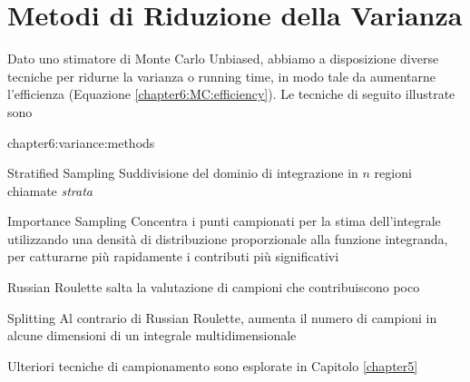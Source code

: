 \section{Metodi di Riduzione della Varianza}
Dato uno stimatore di Monte Carlo Unbiased, abbiamo a disposizione diverse tecniche per ridurne la varianza o running time, in modo tale da aumentarne 
l'efficienza (Equazione \ref{chapter6:MC:efficiency}). Le tecniche di seguito illustrate sono
\begin{altDescription}{chapter6:variance:methods}
	\item[Stratified Sampling] Suddivisione del dominio di integrazione in $n$ regioni chiamate \textit{strata}
	\item[Importance Sampling] Concentra i punti campionati per la stima dell'integrale utilizzando una densit\`a di distribuzione proporzionale alla 
		funzione integranda, per catturarne pi\`u rapidamente i contributi pi\`u significativi
	\item[Russian Roulette] salta la valutazione di campioni che contribuiscono poco
	\item[Splitting] Al contrario di Russian Roulette, aumenta il numero di campioni in alcune dimensioni di un integrale multidimensionale
\end{altDescription}
Ulteriori tecniche di campionamento sono esplorate in Capitolo \ref{chapter5}
